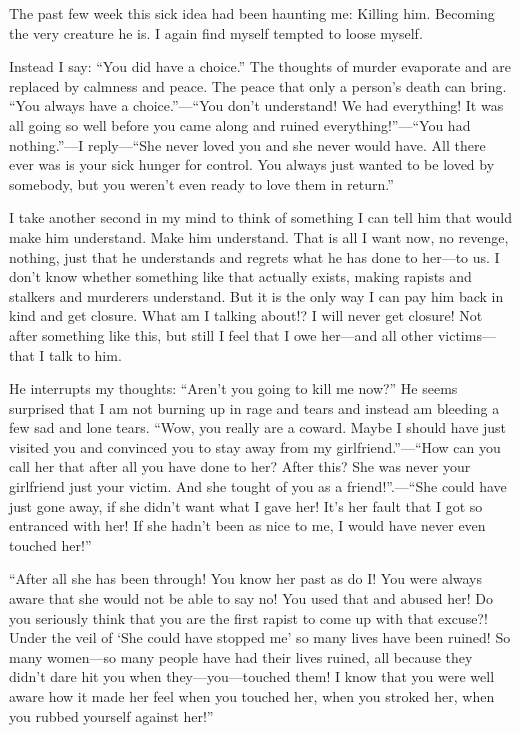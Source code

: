 \documentclass{article}
\begin{document}
	\medskip
	
	The past few week this sick idea had been haunting me: Killing him. Becoming the very creature he is. I again find myself tempted to loose myself.
	
	\pagebreak
	Instead I say: \enquote{You did have a choice.} The thoughts of murder evaporate and are replaced by calmness and peace. The peace that only a person's death can bring. \enquote{You always have a choice.}—\enquote{You don't understand! We had everything! It was all going so well before you came along and ruined everything!}—\enquote{You had nothing.}—I reply—\enquote{She never loved you and she never would have. All there ever was is your sick hunger for control. You always just wanted to be loved by somebody, but you weren't even ready to love them in return.}
	
	\medskip
	
	I take another second in my mind to think of something I can tell him that would make him understand. Make him understand. That is all I want now, no revenge, nothing, just that he understands and regrets what he has done to her—to us. I don't know whether something like that actually exists, making rapists and stalkers and murderers understand. But it is the only way I can pay him back in kind and get closure. What am I talking about!? I will never get closure! Not after something like this, but still I feel that I owe her—and all other victims—that I talk to him.
	
	\medskip
	
	He interrupts my thoughts: \enquote{Aren't you going to kill me now?} He seems surprised that I am not burning up in rage and tears and instead am bleeding a few sad and lone tears. \enquote{Wow, you really are a coward. Maybe I should have just visited you and convinced you to stay  away from my girlfriend.}—\enquote{How can you call her that after all you have done to her? After this? She was never your girlfriend just your victim. And she tought of you as a friend!}.—\enquote{She could have just gone away, if she didn't want what I gave her! It's her fault that I got so entranced with her! If she hadn't been as nice to me, I would have never even touched her!}
	
	\medskip
	
	\enquote{After all she has been through! You know her past as do I! You were always aware that she would not be able to say no! You used that and abused her! Do you seriously think that you are the first rapist to come up with that excuse?! Under the veil of \enquote{She could have stopped me} so many lives have been ruined! So many women—so many people have had their lives ruined, all because they didn't dare hit you when they—you—touched them! I know that you were well aware how it made her feel when you touched her, when you stroked her, when you rubbed yourself against her!}
	
\end{document}
